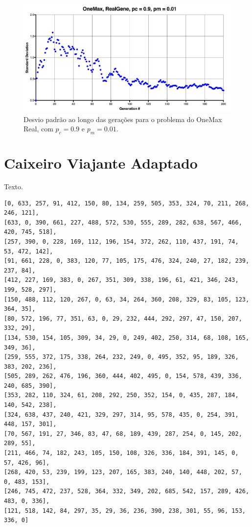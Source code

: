 \begin{figure}[ht!]
    \centering \includegraphics[width=1.0\textwidth]{onemax_real_std.jpg}
    \caption{Desvio padrão ao longo das gerações para o problema do OneMax Real, com $p_c=0.9$ e $p_m=0.01$.}
    \label{fig:onemax_boolean}
\end{figure}

\section{Caixeiro Viajante Adaptado}

Texto.

\begin{lstlisting}[float, floatplacement=H, caption={Mapa de cidades para o problema do Caixeiro Viajante Adaptado.}, label=lst:cidades]
[0, 633, 257, 91, 412, 150, 80, 134, 259, 505, 353, 324, 70, 211, 268, 246, 121],
[633, 0, 390, 661, 227, 488, 572, 530, 555, 289, 282, 638, 567, 466, 420, 745, 518],
[257, 390, 0, 228, 169, 112, 196, 154, 372, 262, 110, 437, 191, 74, 53, 472, 142],
[91, 661, 228, 0, 383, 120, 77, 105, 175, 476, 324, 240, 27, 182, 239, 237, 84],
[412, 227, 169, 383, 0, 267, 351, 309, 338, 196, 61, 421, 346, 243, 199, 528, 297],
[150, 488, 112, 120, 267, 0, 63, 34, 264, 360, 208, 329, 83, 105, 123, 364, 35],
[80, 572, 196, 77, 351, 63, 0, 29, 232, 444, 292, 297, 47, 150, 207, 332, 29],
[134, 530, 154, 105, 309, 34, 29, 0, 249, 402, 250, 314, 68, 108, 165, 349, 36],
[259, 555, 372, 175, 338, 264, 232, 249, 0, 495, 352, 95, 189, 326, 383, 202, 236],
[505, 289, 262, 476, 196, 360, 444, 402, 495, 0, 154, 578, 439, 336, 240, 685, 390],
[353, 282, 110, 324, 61, 208, 292, 250, 352, 154, 0, 435, 287, 184, 140, 542, 238],
[324, 638, 437, 240, 421, 329, 297, 314, 95, 578, 435, 0, 254, 391, 448, 157, 301],
[70, 567, 191, 27, 346, 83, 47, 68, 189, 439, 287, 254, 0, 145, 202, 289, 55],
[211, 466, 74, 182, 243, 105, 150, 108, 326, 336, 184, 391, 145, 0, 57, 426, 96],
[268, 420, 53, 239, 199, 123, 207, 165, 383, 240, 140, 448, 202, 57, 0, 483, 153],
[246, 745, 472, 237, 528, 364, 332, 349, 202, 685, 542, 157, 289, 426, 483, 0, 336],
[121, 518, 142, 84, 297, 35, 29, 36, 236, 390, 238, 301, 55, 96, 153, 336, 0]
\end{lstlisting}